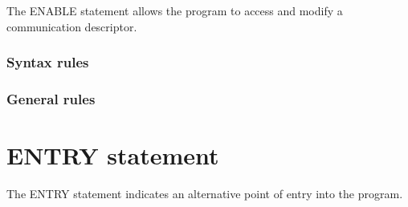 The ENABLE statement allows the program to access and modify a communication descriptor.

\begin{syntax}[\deletedcolour]
\end{syntax}

\subsubsection{Syntax rules}

\subsubsection{General rules}

\section{ENTRY statement}

The ENTRY statement indicates an alternative point of entry into the program.

